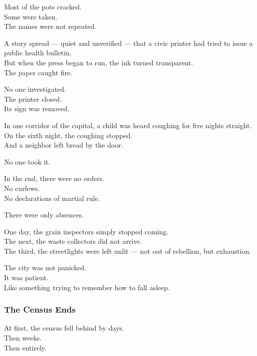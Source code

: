 \documentclass[12pt]{article}
\begin{document}
Most of the pots cracked.\\
Some were taken.\\
The names were not repeated.

\vspace{1em}

A story spread — quiet and unverified — that a civic printer had tried to issue a public health bulletin.\\
But when the press began to run, the ink turned transparent.\\
The paper caught fire.

No one investigated.\\
The printer closed.\\
Its sign was removed.

\vspace{1em}

In one corridor of the capital, a child was heard coughing for five nights straight.\\
On the sixth night, the coughing stopped.\\
And a neighbor left bread by the door.

No one took it.

\vspace{1em}

In the end, there were no orders.\\
No curfews.\\
No declarations of martial rule.

There were only absences.

One day, the grain inspectors simply stopped coming.\\
The next, the waste collectors did not arrive.\\
The third, the streetlights were left unlit — not out of rebellion, but exhaustion.

The city was not panicked.\\
It was patient.\\
Like something trying to remember how to fall asleep.

\dotfill

\subsubsection*{The Census Ends}

At first, the census fell behind by days.\\
Then weeks.\\
Then entirely.
\end{document}
